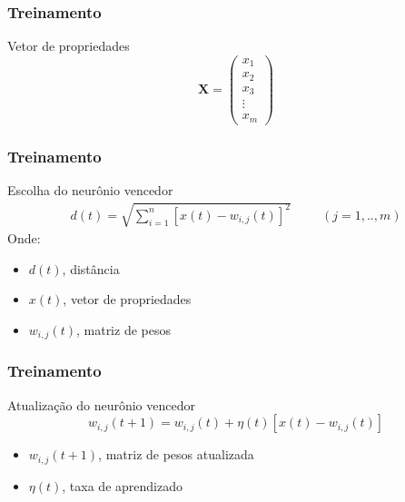 \documentclass[aspectratio=10]{beamer} %
\begin{document}
\begin{frame}
\frametitle{Treinamento}

\begin{block}{Vetor de propriedades}
\begin{displaymath}
\mathbf{X}=\left(\begin{array}{r}
x_{1}\\
x_{2}\\
x_{3}\\
\vdots \\
x_{m}
\end{array}\right)
\label{inicio}
\end{displaymath}
\end{block}
\end{frame}

\begin{frame}
\frametitle{Treinamento}
\begin{block}{Escolha do neurônio vencedor}
\begin{eqnarray}
d(t)= \sqrt{\sum^{n}_{i=1}[x(t)-w_{i,j}(t)]^{2}} \hspace{1cm}  (j = {1,..,m}) \nonumber
\label{euclidiana}
\end{eqnarray}
Onde:
\end{block}
\begin{itemize}
\pause
\item $d(t)$, distância 
\pause
\item $x(t)$, vetor de propriedades
\pause
\item $w_{i,j}(t)$, matriz de pesos
\end{itemize}
\end{frame}

\begin{frame}
\frametitle{Treinamento}
\begin{block}{Atualização do neurônio vencedor}
\begin{equation}
w_{i,j}(t+1)=w_{i,j}(t)+\eta(t)[x(t)-w_{i,j}(t)] \nonumber
\label{ajuste de pesos}
\end{equation}
\end{block}
\begin{itemize}
\pause
\item $w_{i,j}(t+1)$, matriz de pesos atualizada
\pause
\item $\eta(t)$,  taxa de aprendizado
\end{itemize}
\end{frame}
\end{document}
